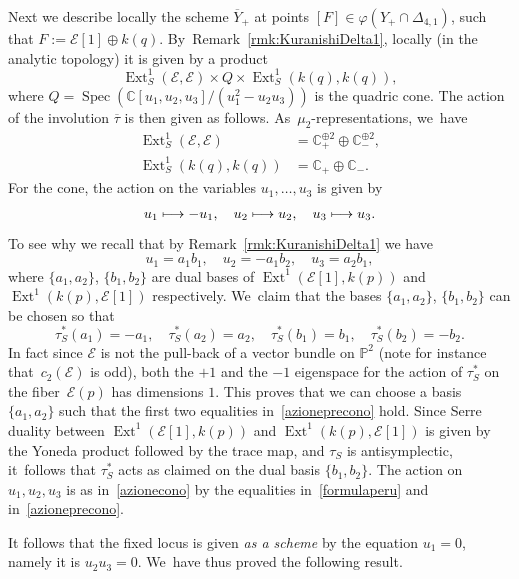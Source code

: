 \documentclass[JEP,XML,SOM,Unicode,published]{cedram}
\newcommand\mto{\mathchoice{\longmapsto}{\mapsto}{\mapsto}{\mapsto}}
\newcommand{\CC}{{\mathbb C}}\let\C\CC
\newcommand{\PP}{{\mathbb P}}\let\P\PP
\newcommand\cE{\mathcal{E}}
\DeclareMathOperator{\Ext}{Ext}
\DeclareMathOperator{\Spec}{Spec}
\let\ov\overline
\let\phi\varphi
\theoremstyle{definition}
\begin{document}
Next we describe locally the scheme $\ov{Y}_+$ at points $[F]\in\phi(Y_+\cap \Delta_{4,1})$, \ie such that $F:=\cE[1]\oplus k(q)$. By~Remark~\ref{rmk:KuranishiDelta1}, locally (in the analytic topology) it is given by a product
\[
\Ext^1_S(\cE,\cE)\times Q \times \Ext^1_S(k(q),k(q)),
\]
where $Q=\Spec(\CC[u_1,u_2,u_3]/(u_1^2-u_2u_3))$ is the quadric cone.
The action of the involution $\overline{\tau}$ is then given as follows. As~$\mu_2$-representations, we~have
\begin{align*}
\Ext^1_S(\cE,\cE) &= \C_{+}^{\oplus 2}\oplus \C_{-}^{\oplus 2},\\
\Ext^1_S(k(q),k(q)) &= \C_{+}\oplus \C_{-}.
\end{align*}
For the cone, the action on the variables $u_1,\dots,u_3$ is given by
\begin{equation}\label{azionecono}
u_1\mto -u_1,\quad u_2\mto u_2,\quad u_3\mto u_3.
\end{equation}
To see why we recall that by Remark~\ref{rmk:KuranishiDelta1} we have
\begin{equation}\label{formulaperu}
u_1=a_1 b_1,\quad u_2=-a_1 b_2,\quad u_3=a_2 b_1,
\end{equation}
where $\{a_1,a_2\}$, $\{b_1,b_2\}$ are dual bases of $\Ext^1(\cE[1],k(p))$ and $\Ext^1(k(p),\cE[1])$ respectively. We~claim that the bases $\{a_1,a_2\}$, $\{b_1,b_2\}$ can be chosen so that
\begin{equation}\label{azioneprecono}
\tau_S^{*}(a_1)=-a_1,\quad \tau_S^{*}(a_2)=a_2,\quad
\tau_S^{*}(b_1)=b_1,\quad \tau_S^{*}(b_2)=-b_2.
\end{equation}
In fact since $\cE$ is not the pull-back of a vector bundle on $\PP^2$ (note for instance that~$c_2(\cE)$ is odd), both the $+1$ and the $-1$ eigenspace for the action of $\tau_S^{*}$ on the fiber~$\cE(p)$ has dimensions $1$.
This proves that we can choose a basis $\{a_1,a_2\}$ such that the first two equalities in~\eqref{azioneprecono} hold. Since Serre duality between $\Ext^1(\cE[1],k(p))$ and $\Ext^1(k(p),\cE[1])$ is given by the Yoneda product followed by the trace map, and $\tau_S$ is antisymplectic, it~follows that $\tau_S^{*}$ acts as claimed on the dual basis $\{b_1,b_2\}$.
The action on $u_1,u_2,u_3$ is as in~\eqref{azionecono} by the equalities in~\eqref{formulaperu} and in~\eqref{azioneprecono}.

It follows that the fixed locus is given \emph{as a scheme} by the equation $u_1=0$, namely it is $u_2u_3=0$. We~have thus proved the following result.
\end{document}
